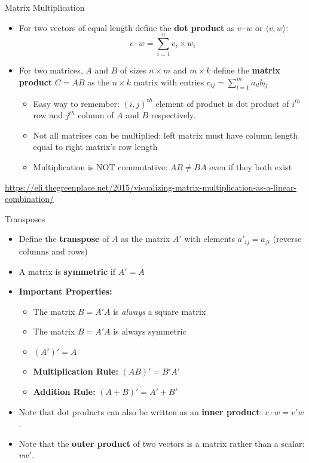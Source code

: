 \documentclass[aspectratio=169,11pt]{beamer}
\begin{document}
\begin{frame}{Matrix Multiplication}
	\begin{itemize}
		\item For two vectors of equal length define the {\bf dot product} as $v\cdot w$ or $\langle v, w \rangle$:
			\[
				v\cdot w = \sum_{i=1}^n v_i\times w_i
			\]
		\item For two matrices, $A$ and $B$ of sizes $n\times m$ and $m\times k$ define the {\bf matrix product} $C=AB$ as the $n\times k$ matrix with entries $c_{ij}=\sum_{l=1}^ma_{il}b_{lj}$
		\begin{itemize}
			\item Easy way to remember: $(i,j)^{th}$ element of product is dot product of $i^{th}$ row and $j^{th}$ column of $A$ and $B$ respectively.
			\item Not all matrices can be multiplied: left matrix must have column length equal to right matrix's row length
			\item Multiplication is NOT commutative: $AB\ne BA$ even if they both exist
		\end{itemize}
	\end{itemize}
	\url{https://eli.thegreenplace.net/2015/visualizing-matrix-multiplication-as-a-linear-combination/}
\end{frame}


\begin{frame}{Transposes}
\begin{itemize}	
	\item Define the {\bf transpose} of $A$ as the matrix $A'$ with elements $a'_{ij} = a_{ji}$ (reverse columns and rows)
	\item A matrix is {\bf symmetric} if $A'=A$
	\item {\bf Important Properties:}
		\begin{itemize}
			\item The matrix $B = A'A$ is \emph{always} a square matrix
			\item The matrix $B=A'A$ is always symmetric
			\item $(A')' = A$
			\item {\bf Multiplication Rule:} $(AB)' = B'A'$
			\item {\bf Addition Rule:} $(A+B)' = A'+B'$
		\end{itemize}
	\item Note that dot products can also be written as an {\bf inner product}: $v\cdot w = v' w$.
	\item Note that the {\bf outer product} of two vectors is a matrix rather than a scalar: $v w'$.

\end{itemize}

\end{frame}
\end{document}
